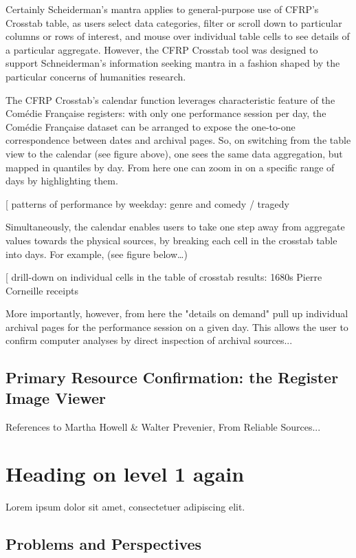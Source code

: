 \documentclass[	DIV=calc,%
							paper=a4,%
							fontsize=11pt,%
							twocolumn]{scrartcl}	 					%
\begin{document}
Certainly Scheiderman’s mantra applies to general-purpose use of CFRP’s Crosstab table, as users select data categories, filter or scroll down to particular columns or rows of interest, and mouse over individual table cells to see details of a particular aggregate.  However, the CFRP Crosstab tool was designed to support Schneiderman’s information seeking mantra in a fashion shaped by the particular concerns of humanities research.

The CFRP Crosstab’s calendar function leverages characteristic feature of the Comédie Française registers: with only one performance session per day, the Comédie Française dataset can be arranged to expose the one-to-one correspondence between dates and archival pages.  So, on switching from the table view to the calendar (see figure above), one sees the same data aggregation, but mapped in quantiles by day.  From here one can zoom in on a specific range of days by highlighting them.

[ patterns of performance by weekday: genre and comedy / tragedy

Simultaneously, the calendar enables users to take one step away from aggregate values towards the physical sources, by breaking each cell in the crosstab table into days.  For example, (see figure below…)

[ drill-down on individual cells in the table of crosstab results: 1680s Pierre Corneille receipts

More importantly, however, from here the "details on demand" pull up individual archival pages for the performance session on a given day.  This allows the user to confirm computer analyses by direct inspection of archival sources...

\subsection*{Primary Resource Confirmation: the Register Image Viewer}

References to Martha Howell \& Walter Prevenier, From Reliable Sources...

\section*{Heading on level 1 again}
Lorem ipsum dolor sit amet, consectetuer adipiscing elit.

\subsection*{Problems and Perspectives}
\end{document}

